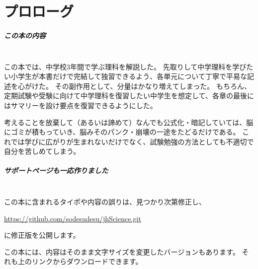\chapter{プロローグ}

\paragraph{この本の内容}
\mbox{}\\
\indent
この本では、中学校3年間で学ぶ理科を解説した。
先取りして中学理科を学びたい小学生が本書だけで完結して独習できるよう、各単元について丁寧で平易な記述を心がけた。
その副作用として、分量はかなり増えてしまった。
もちろん、定期試験や受験に向けて中学理科を復習したい中学生を想定して、各章の最後にはサマリーを設け要点を復習できるようにした。

考えることを放棄して（あるいは諦めて）なんでも公式化・暗記していては、脳にゴミが積もっていき、脳みそのパンク・崩壊の一途をたどるだけである。
これでは学びに広がりが生まれないだけでなく、試験勉強の方法としても不適切で自分を苦しめてしまう。

\paragraph{サポートページも一応作りました}
\mbox{}\\
\indent
この本に含まれるタイポや内容の誤りは、見つかり次第修正し、
\begin{center}
  \url{https://github.com/sodesudesu/jhScience.git}
\end{center}
に修正版を公開します。

この本には、内容はそのまま文字サイズを変更したバージョンもあります。
それも上のリンクからダウンロードできます。
